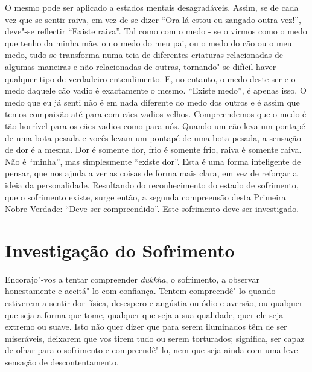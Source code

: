 O mesmo pode ser aplicado a estados mentais desagradáveis. Assim, se de cada vez
que se sentir raiva, em vez de se dizer “Ora lá estou eu zangado outra vez!”,
deve"-se reflectir “Existe raiva”. Tal como com o medo - se o virmos como o medo
que tenho da minha mãe, ou o medo do meu pai, ou o medo do cão ou o meu medo,
tudo se transforma numa teia de diferentes criaturas relacionadas de algumas
maneiras e não relacionadas de outras, tornando"-se difícil haver qualquer tipo
de verdadeiro entendimento. E, no entanto, o medo deste ser e o medo daquele cão
vadio é exactamente o mesmo. “Existe medo”, é apenas isso. O medo que eu já
senti não é em nada diferente do medo dos outros e é assim que temos compaixão
até para com cães vadios velhos. Compreendemos que o medo é tão horrível para os
cães vadios como para nós. Quando um cão leva um pontapé de uma bota pesada e
vocês levam um pontapé de uma bota pesada, a sensação de dor é a mesma. Dor é
somente dor, frio é somente frio, raiva é somente raiva. Não é “minha”, mas simplesmente
“existe dor”. Esta é uma forma inteligente de pensar, que nos ajuda a ver as
coisas de forma mais clara, em vez de reforçar a ideia da personalidade.
Resultando do reconhecimento do estado de sofrimento, que o sofrimento existe,
surge então, a segunda compreensão desta Primeira Nobre Verdade: “Deve ser
compreendido”. Este sofrimento deve ser investigado.

\section{Investigação do Sofrimento}

Encorajo"-vos a tentar compreender \emph{dukkha}, o sofrimento, a observar
honestamente e aceitá"-lo com confiança. Tentem compreendê"-lo quando estiverem a
sentir dor física, desespero e angústia ou ódio e aversão, ou qualquer que seja
a forma que tome, qualquer que seja a sua qualidade, quer ele seja extremo ou
suave. Isto não quer dizer que para serem iluminados têm de ser
miseráveis, deixarem que vos tirem tudo ou serem torturados; significa, ser capaz
de olhar para o sofrimento e compreendê"-lo, nem que seja ainda com uma leve
sensação de descontentamento.

